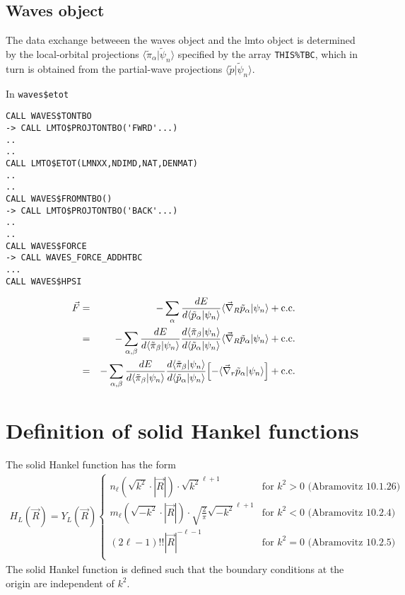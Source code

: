 \documentclass[11pt,a4paper]{report}
\begin{document}
\section{Waves object}
The data exchange betweeen the waves object and the lmto object is
determined by the local-orbital projections
$\langle\tilde{\pi}_\alpha|\tilde{\psi}_n\rangle$ specified by the
array \verb|THIS%TBC|, which in turn is obtained from the partial-wave
projections $\langle\tilde{p}|\tilde{\psi}_n\rangle$.



In \verb|waves$etot|
\begin{verbatim}
CALL WAVES$TONTBO
-> CALL LMTO$PROJTONTBO('FWRD'...)
..
..
CALL LMTO$ETOT(LMNXX,NDIMD,NAT,DENMAT)
..
..
CALL WAVES$FROMNTBO()
-> CALL LMTO$PROJTONTBO('BACK'...)
..
..
CALL WAVES$FORCE
-> CALL WAVES_FORCE_ADDHTBC
...
CALL WAVES$HPSI
\end{verbatim}


\begin{eqnarray*}
\vec{F}&=&
-\sum_\alpha
\frac{dE}{d\langle\tilde{p}_\alpha|\psi_n\rangle}
\langle\vec{\nabla}_R\tilde{p}_\alpha|\psi_n\rangle
+\mathrm{c.c.}
\nonumber\\
&=&-\sum_{\alpha,\beta}
\frac{dE}{d\langle\tilde{\pi}_\beta|\psi_n\rangle}
\frac{d\langle\tilde{\pi}_\beta|\psi_n\rangle}
{d\langle\tilde{p}_\alpha|\psi_n\rangle}
\langle\vec{\nabla}_R\tilde{p}_\alpha|\psi_n\rangle
+\mathrm{c.c.}
\nonumber\\
&=&-\sum_{\alpha,\beta}
\frac{dE}{d\langle\tilde{\pi}_\beta|\psi_n\rangle}
\frac{d\langle\tilde{\pi}_\beta|\psi_n\rangle}
{d\langle\tilde{p}_\alpha|\psi_n\rangle}
\Bigl[-\langle\vec{\nabla}_r\tilde{p}_\alpha|\psi_n\rangle\Bigr]
+\mathrm{c.c.}
\end{eqnarray*}





\appendix
\chapter{Definition of solid Hankel functions}
\label{app:solidhankel}
The solid Hankel function has the form
\begin{eqnarray}
H_L(\vec{R})=Y_L(\vec{R})
\begin{cases}
n_\ell(\sqrt{k^2}\cdot|\vec{R}|) \cdot \sqrt{k^2}^{\ell+1}
&\text{for $k^2>0$  (Abramovitz 10.1.26)}\\
m_\ell(\sqrt{-k^2}\cdot|\vec{R}|) \cdot \sqrt{\frac{2}{\pi}} \sqrt{-k^2}^{\ell+1}
&\text{for $k^2<0$  (Abramovitz 10.2.4)}\\
(2\ell-1)!! |\vec{R}|^{-\ell-1} 
&\text{for $k^2=0$  (Abramovitz 10.2.5)}\\
\end{cases}
\end{eqnarray}
The solid Hankel function is defined such that the boundary conditions
at the origin are independent of $k^2$.
\end{document}
